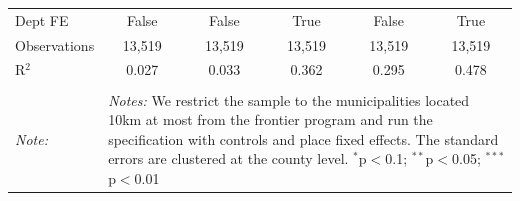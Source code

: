 \begin{table}[!htbp]
{\begin{tabular}{@{\extracolsep{3pt}}lccccc}
Dept FE & False & False & True & False & True \\ 
Observations & 13,519 & 13,519 & 13,519 & 13,519 & 13,519 \\ 
R$^{2}$ & 0.027 & 0.033 & 0.362 & 0.295 & 0.478 \\ 
\hline 
\hline \\[-1.8ex] 
\textit{Note:}  & \multicolumn{5}{l}{\parbox{\textwidth}{\footnotesize \textit{Notes:} We restrict the sample to the municipalities located 10km at most from the frontier program and run the specification with controls and place fixed effects. The standard errors are clustered at the county level. $^{*}$p$<$0.1; $^{**}$p$<$0.05; $^{***}$p$<$0.01}} \\ 
\end{tabular}
}%
\end{table} 
